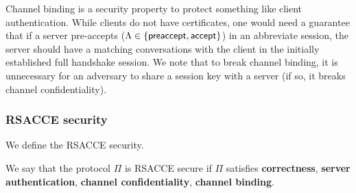 \begin{remark}
Channel binding is a security property to protect something like client authentication.
While clients do not have certificates, one would need a guarantee that if a server
pre-accepts ($\Lambda \in \{\mathsf{preaccept}, \mathsf{accept} \}$)
in an abbreviate session, the server should have a matching conversations with the client
in the initially established full handshake session.
We note that to break channel binding, it is unnecessary for an adversary to share a session key with a server
(if so, it breaks channel confidentiality).
\end{remark}

\subsubsection{RSACCE security}
We define the RSACCE security.

\begin{definition}
 We say that the protocol $\Pi$ is RSACCE secure
 if $\Pi$ satisfies \textbf{correctness},
 \textbf{server authentication},
 \textbf{channel confidentiality}, \textbf{channel binding}.
\end{definition}